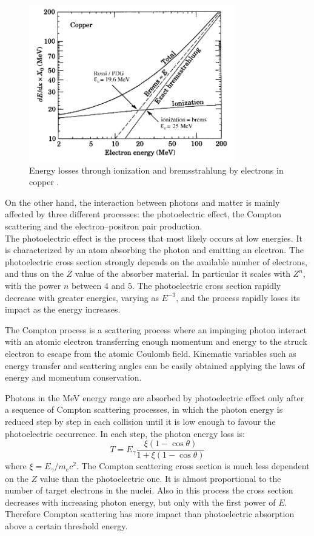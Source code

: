 \begin{figure}
	\centering
	\includegraphics[width=0.8\textwidth]{IMG/Cap2/Cu_rad_ion}
	\caption{Energy losses through ionization and bremsstrahlung by  electrons in copper \cite{PDG_98}.}
	\label{fig:Cu_rad_ion}
\end{figure}

On the other hand, the interaction between photons and matter is mainly affected by three different processes: the photoelectric effect, the Compton scattering and the electron–positron pair production.\\
The photoelectric effect is the process that most likely occurs at low energies. It is characterized by an atom absorbing the photon and emitting an electron. The photoelectric cross section strongly depends on the available number of  electrons,  and  thus  on  the $Z$ value  of  the  absorber  material. In particular it scales with $Z^n$, with the power $n$ between $4$ and $5$. The photoelectric cross section rapidly decrease with greater energies, varying as $E^{-3}$, and the process rapidly loses its impact as the energy increases.

The Compton process is a scattering process where an impinging  photon interact with an atomic electron transferring enough momentum and energy to the struck electron to escape from the atomic Coulomb field. Kinematic variables such as energy transfer and scattering angles can be easily obtained applying the laws of energy and momentum conservation.

Photons in the MeV energy range are absorbed by photoelectric effect only after a sequence of Compton scattering processes, in which the photon energy is reduced step by step in each collision until it is low enough to favour the photoelectric occurrence. In each step, the photon energy loss is:
\begin{equation}
    T = E_{\gamma}\frac{\xi(1 - \cos{\theta})}{1 + \xi(1 - \cos{\theta})}
\end{equation}
where $\xi = E_{\gamma}/m_ec^2$.
The Compton scattering cross section is much less dependent on the $Z$ value than the photoelectric one. It is almost proportional to the number of target electrons in the nuclei. Also in this process the cross section decreases with increasing photon energy, but only with the first power of $E$. Therefore Compton scattering has more impact than photoelectric absorption above a certain threshold energy. 

